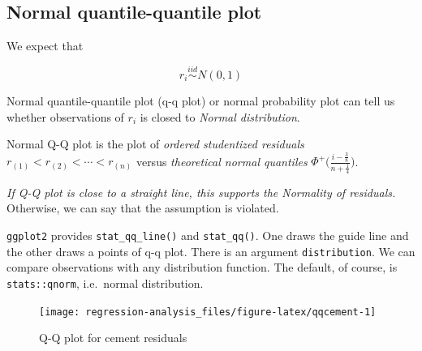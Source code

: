 \documentclass[]{book}
\newenvironment{Shaded}{\begin{snugshade}}{\end{snugshade}}
\newcommand{\DataTypeTok}[1]{\textcolor[rgb]{0.13,0.29,0.53}{#1}}
\newcommand{\DecValTok}[1]{\textcolor[rgb]{0.00,0.00,0.81}{#1}}
\newcommand{\KeywordTok}[1]{\textcolor[rgb]{0.13,0.29,0.53}{\textbf{#1}}}
\newcommand{\NormalTok}[1]{#1}
\newcommand{\OperatorTok}[1]{\textcolor[rgb]{0.81,0.36,0.00}{\textbf{#1}}}
\newcommand{\StringTok}[1]{\textcolor[rgb]{0.31,0.60,0.02}{#1}}
\theoremstyle{definition}
\theoremstyle{definition}
\theoremstyle{definition}
\theoremstyle{remark}
\let\BeginKnitrBlock\begin \let\EndKnitrBlock\end
\begin{document}
\hypertarget{normal-quantile-quantile-plot}{%
\subsection{Normal quantile-quantile plot}\label{normal-quantile-quantile-plot}}

We expect that

\[r_i \stackrel{iid}{\sim}N(0, 1)\]

Normal quantile-quantile plot (q-q plot) or normal probability plot can tell us whether observations of \(r_i\) is closed to \emph{Normal distribution}.

\BeginKnitrBlock{definition}[Normal q-q plot]
\protect\hypertarget{def:qqpt}{}{\label{def:qqpt} {} }Normal Q-Q plot is the plot of \textit{ordered studentized residuals} \(r_{(1)} < r_{(2)} < \cdots < r_{(n)}\) versus \textit{theoretical normal quantiles} \(\Phi^{+}\bigg( \frac{i - \frac{3}{8}}{n + \frac{1}{4}} \bigg)\).
\EndKnitrBlock{definition}

\emph{If Q-Q plot is close to a straight line, this supports the Normality of residuals.} Otherwise, we can say that the assumption is violated.

\texttt{ggplot2} provides \texttt{stat\_qq\_line()} and \texttt{stat\_qq()}. One draws the guide line and the other draws a points of q-q plot. There is an argument \texttt{distribution}. We can compare observations with any distribution function. The default, of course, is \texttt{stats::qnorm}, i.e.~normal distribution.

\begin{Shaded}
\end{Shaded}

\begin{figure}[H]

{\centering \texttt{[image: regression-analysis\_files/figure-latex/qqcement-1]} 

}

\caption{Q-Q plot for cement residuals}\label{fig:qqcement}
\end{figure}
\end{document}
